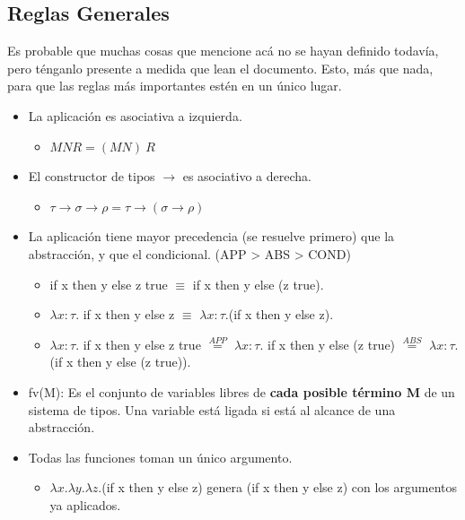 \documentclass[10pt,a4paper]{article}
\begin{document}
\subsection*{Reglas Generales}
Es probable que muchas cosas que mencione acá no se hayan definido todavía, pero ténganlo presente a medida que lean el documento. Esto, más que nada, para que las reglas más importantes estén en un único lugar. 
\begin{itemize}
    \item La aplicación es asociativa a izquierda.
    \begin{itemize}
        \item $M N R = (M N) \ R$
    \end{itemize}
    \item El constructor de tipos $\rightarrow$ es asociativo a derecha.
    \begin{itemize}
        \item $\tau \rightarrow \sigma \rightarrow \rho = \tau \rightarrow (\sigma \rightarrow \rho)$
    \end{itemize}
    \item La aplicación tiene mayor precedencia (se resuelve primero) que la abstracción, y que el condicional. (APP > ABS > COND)
    \begin{itemize}
        \item if x then y else z true $\equiv$ if x then y else (z true). 
        \item $\lambda x:\tau$. if x then y else z  $\equiv$ $\lambda x:\tau.$(if x then y else z). 
        \item $\lambda x:\tau .$ if x then y else z true $\stackrel{APP}{=}$ $\lambda x:\tau.$ if x then y else (z true) $\stackrel{ABS}{=}$ $\lambda x:\tau. $(if x then y else (z true)). 
    \end{itemize}
    \item fv(M): Es el conjunto de variables libres de \textbf{cada posible término M} de un sistema de tipos. Una variable está ligada si está al alcance de una abstracción.
    \item Todas las funciones toman un único argumento. 
    \begin{itemize}
        \item $\lambda x.\lambda y. \lambda z.$(if x then y else z) genera (if x then y else z) con los argumentos ya aplicados.
    \end{itemize}
\end{itemize}
\end{document}
